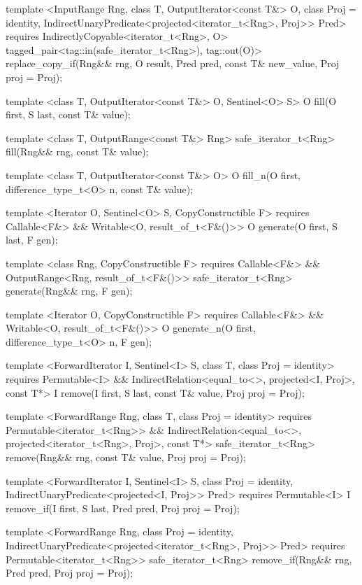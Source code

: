\begin{codeblock}
{{{{  template <InputRange Rng, class T, OutputIterator<const T&> O, class Proj = identity,
      IndirectUnaryPredicate<projected<iterator_t<Rng>, Proj>> Pred>
    requires IndirectlyCopyable<iterator_t<Rng>, O>
    tagged_pair<tag::in(safe_iterator_t<Rng>), tag::out(O)>
      replace_copy_if(Rng&& rng, O result, Pred pred, const T& new_value,
                      Proj proj = Proj{});

  template <class T, OutputIterator<const T&> O, Sentinel<O> S>
    O fill(O first, S last, const T& value);

  template <class T, OutputRange<const T&> Rng>
    safe_iterator_t<Rng>
      fill(Rng&& rng, const T& value);

  template <class T, OutputIterator<const T&> O>
    O fill_n(O first, difference_type_t<O> n, const T& value);

  template <Iterator O, Sentinel<O> S, CopyConstructible F>
      requires Callable<F&> && Writable<O, result_of_t<F&()>>
    O generate(O first, S last, F gen);

  template <class Rng, CopyConstructible F>
      requires Callable<F&> && OutputRange<Rng, result_of_t<F&()>>
    safe_iterator_t<Rng>
      generate(Rng&& rng, F gen);

  template <Iterator O, CopyConstructible F>
      requires Callable<F&> && Writable<O, result_of_t<F&()>>
    O generate_n(O first, difference_type_t<O> n, F gen);

  template <ForwardIterator I, Sentinel<I> S, class T, class Proj = identity>
    requires Permutable<I> &&
      IndirectRelation<equal_to<>, projected<I, Proj>, const T*>
    I remove(I first, S last, const T& value, Proj proj = Proj{});

  template <ForwardRange Rng, class T, class Proj = identity>
    requires Permutable<iterator_t<Rng>> &&
      IndirectRelation<equal_to<>, projected<iterator_t<Rng>, Proj>, const T*>
    safe_iterator_t<Rng>
      remove(Rng&& rng, const T& value, Proj proj = Proj{});

  template <ForwardIterator I, Sentinel<I> S, class Proj = identity,
      IndirectUnaryPredicate<projected<I, Proj>> Pred>
    requires Permutable<I>
    I remove_if(I first, S last, Pred pred, Proj proj = Proj{});

  template <ForwardRange Rng, class Proj = identity,
      IndirectUnaryPredicate<projected<iterator_t<Rng>, Proj>> Pred>
    requires Permutable<iterator_t<Rng>>
    safe_iterator_t<Rng>
      remove_if(Rng&& rng, Pred pred, Proj proj = Proj{});

}}}}
\end{codeblock}
